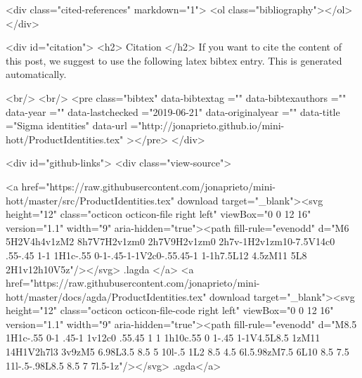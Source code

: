   <div class="cited-references" markdown="1">
  <ol class="bibliography"></ol>
  </div>


  
  <div id="citation">
  <h2> Citation </h2>
  If you want to cite the content of this post,
  we suggest to use the following latex bibtex entry.
  This is generated automatically.

  <br/>
  <br/>
  <pre class="bibtex"
       data-bibtextag =""
       data-bibtexauthors =""
       data-year =""
       data-lastchecked ="2019-06-21"
       data-originalyear =""
       data-title ="Sigma identities"
       data-url ="http://jonaprieto.github.io/mini-hott/ProductIdentities.tex"
  ></pre>
  </div>
  

  <div id="github-links">
    <div class="view-source">
      
        <a href="https://raw.githubusercontent.com/jonaprieto/mini-hott/master/src/ProductIdentities.tex" download target="_blank"><svg height="12" class="octicon octicon-file right left" viewBox="0 0 12 16" version="1.1" width="9" aria-hidden="true"><path fill-rule="evenodd" d="M6 5H2V4h4v1zM2 8h7V7H2v1zm0 2h7V9H2v1zm0 2h7v-1H2v1zm10-7.5V14c0 .55-.45 1-1 1H1c-.55 0-1-.45-1-1V2c0-.55.45-1 1-1h7.5L12 4.5zM11 5L8 2H1v12h10V5z"/></svg> .lagda </a>
        <a href="https://raw.githubusercontent.com/jonaprieto/mini-hott/master/docs/agda/ProductIdentities.tex" download target="_blank"><svg height="12" class="octicon octicon-file-code right left" viewBox="0 0 12 16" version="1.1" width="9" aria-hidden="true"><path fill-rule="evenodd" d="M8.5 1H1c-.55 0-1 .45-1 1v12c0 .55.45 1 1 1h10c.55 0 1-.45 1-1V4.5L8.5 1zM11 14H1V2h7l3 3v9zM5 6.98L3.5 8.5 5 10l-.5 1L2 8.5 4.5 6l.5.98zM7.5 6L10 8.5 7.5 11l-.5-.98L8.5 8.5 7 7l.5-1z"/></svg> .agda</a>
      
